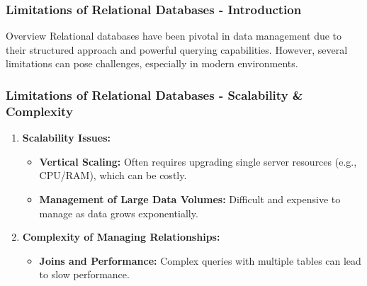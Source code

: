 \documentclass[aspectratio=169]{beamer}
\begin{document}
\begin{frame}[fragile]
    \frametitle{Limitations of Relational Databases - Introduction}
    \begin{block}{Overview}
        Relational databases have been pivotal in data management due to their structured approach and powerful querying capabilities. However, several limitations can pose challenges, especially in modern environments.
    \end{block}
\end{frame}

\begin{frame}[fragile]
    \frametitle{Limitations of Relational Databases - Scalability & Complexity}
    \begin{enumerate}
        \item \textbf{Scalability Issues:}
        \begin{itemize}
            \item \textbf{Vertical Scaling:} Often requires upgrading single server resources (e.g., CPU/RAM), which can be costly.
            \item \textbf{Management of Large Data Volumes:} Difficult and expensive to manage as data grows exponentially.
        \end{itemize}
        
        \item \textbf{Complexity of Managing Relationships:}
        \begin{itemize}
            \item \textbf{Joins and Performance:} Complex queries with multiple tables can lead to slow performance.
        \end{itemize}
    \end{enumerate}
\end{frame}
\end{document}

